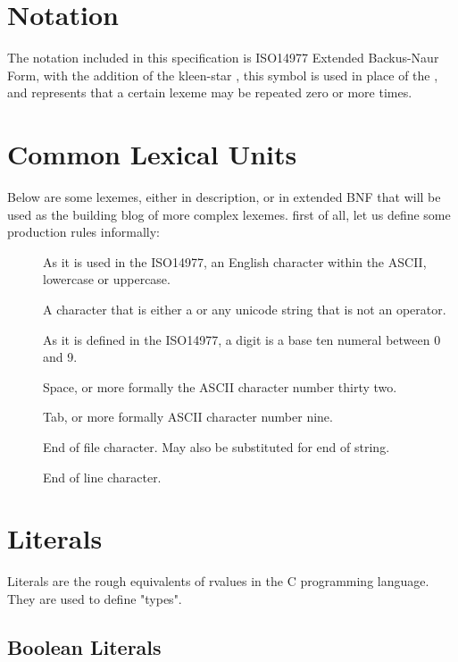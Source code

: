 \documentclass[11pt,a4paper]{book}
\begin{document}
\section{Notation}

The notation included in this specification is ISO14977 Extended Backus-Naur Form, with the addition of the kleen-star , this symbol is used in place of the , and represents that a certain lexeme may be repeated zero or more times. 

\section{Common Lexical Units}

Below are some lexemes, either in description, or in extended BNF that will be used as the building blog of more complex lexemes. first of all, let us define some production rules informally:

\begin{description}
\item[] As it is used in the ISO14977, an English character within the ASCII, lowercase or uppercase.
\item[] A character that is either a  or any unicode string that is not an operator.
\item[] As it is defined in the ISO14977, a digit is a base ten numeral between 0 and 9.
\item[] Space, or more formally the ASCII character number thirty two.
\item[] Tab, or more formally ASCII character number nine.
\item[] End of file character. May also be substituted for end of string.
\item[] End of line character.
\end{description}



\section{Literals}

Literals are the rough equivalents of rvalues in the C programming language. They are used to define "types".

\subsection{Boolean Literals}
\end{document}
